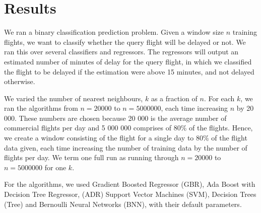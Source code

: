 \documentclass[letterpaper,11pt]{article}
\begin{document}
\section{Results}
We ran a binary classification prediction problem. Given a window size $n$ training flights, we want to classify whether the query flight will be delayed or not. We ran this over several classifiers and regressors. The regressors will output an estimated number of minutes of delay for the query flight, in which we classified the flight to be delayed if the estimation were above 15 minutes, and not delayed otherwise. 

We varied the number of nearest neighbours, $k$ as a fraction of $n$. For each $k$, we ran the algorithms from $n = 20 000$ to $n = 5 000 000$, each time increasing $n$ by 20 000. These numbers are chosen because 20 000 is the average number of commercial flights per day and 5 000 000 comprises of 80\% of the flights. Hence, we create a window consisting of the flight for a single day to 80\% of the flight data given, each time increasing the number of training data by the number of flights per day. We term one full run as running through $n = 20 000$ to $n = 5 000 000$ for one $k$. 

For the algorithms, we used Gradient Boosted Regressor (GBR), Ada Boost with Decision Tree Regressor, (ADR) Support Vector Machines (SVM), Decision Trees (Tree) and Bernoulli Neural Networks (BNN), with their default parameters. 
\end{document}
